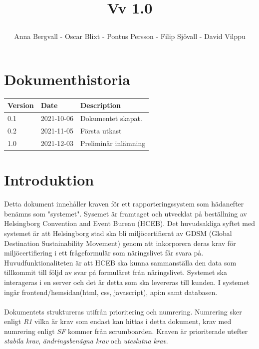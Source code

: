 \documentclass{article}
\date {#1}
\title {
    \documentNumber {01}    

    \documentTitle {Helsingborg Event and Convention Bureau}
    
    \documentDate {2021-08-20}
    \documentVersion Vv 1.0
    
    \author{Anna Bergvall - Oscar Blixt - Pontus Persson - Filip Sjövall - David Vilppu}
}
\begin{document}
\maketitle

\thispagestyle{empty}



\newpage

\tableofcontents


\newpage

\section{Dokumenthistoria}
\begin{tabular}{ l | l | l }
    Version & Date & Description \\
    \hline
    0.1 & 2021-10-06 & Dokumentet skapat. \\
    0.2 & 2021-11-05 & Första utkast\\
    1.0 & 2021-12-03 & Preliminär inlämning\\
    
\end{tabular}

\section{Introduktion}

    Detta dokument innehåller kraven för ett rapporteringssystem som hädanefter benämns som "systemet". Sysemet är framtaget och utvecklat på beställning av Helsingborg Convention and Event Bureau (HCEB). Det huvudsakliga syftet med systemet är att Helsingborg stad ska bli miljöcertifierat av GDSM (Global Destination Sustainability Movement) genom att inkorporera deras krav för miljöcertifiering i ett frågeformulär som näringslivet får svara på. Huvudfunktionaliteten är att HCEB ska kunna sammanställa den data som tillkommit till följd av svar på formuläret från näringslivet. Systemet ska interageras i en server och det är detta som ska levereras till kunden. I systemet ingår frontend/hemsidan(html, css, javascript), api:n samt databasen. 
    \\\\
    Dokumentets struktureras utifrån prioritering och numrering. Numrering sker enligt \textit{R1} vilka är krav som endast kan hittas i detta dokument, krav med numrering enligt \textit{SF} kommer från scrumboarden. Kraven är prioriterade utefter \textit{stabila krav}, \textit{ändringsbenägna krav} och \textit{uteslutna krav}. 
    
\end{document}

